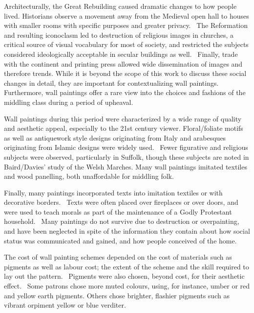Architecturally, the Great Rebuilding caused dramatic changes to how people lived. Historians observe a movement away from the Medieval open hall to houses with smaller rooms with specific purposes and greater privacy.~\autocite{Baird_thesis,Davies_book,Hamling_book} The Reformation and resulting iconoclasm led to destruction of religious images in churches, a critical source of visual vocabulary for most of society, and restricted the subjects considered ideologically acceptable in secular buildings as well.~\autocite{Kirkham_thesis,Hamling_book,Giles} Finally, trade with the continent and printing press allowed wide dissemination of images and therefore trends. While it is beyond the scope of this work to discuss these social changes in detail, they are important for contextualizing wall paintings. Furthermore, wall paintings offer a rare view into the choices and fashions of the middling class during a period of upheaval.~\autocite{Kirkham_thesis,Baird_thesis}

Wall paintings during this period were characterized by a wide range of quality and aesthetic appeal, especially to the 21st century viewer. Floral/foliate motifs as well as antiquework style designs originating from Italy and arabesques originating from Islamic designs were widely used.~\autocite{Kirkham_thesis,Baird_thesis,Thornton_book} Fewer figurative and religious subjects were observed, particularly in Suffolk, though these subjects are noted in Baird/Davies' study of the Welsh Marches. Many wall paintings imitated textiles and wood panelling, both unaffordable for middling folk. 

Finally, many paintings incorporated texts into imitation textiles or with decorative borders.~\autocite{Baird_thesis,Kirkham_thesis} Texts were often placed over fireplaces or over doors, and were used to teach morals as part of the maintenance of a Godly Protestant household.~\autocite{Hamling_book} Many paintings do not survive due to destruction or overpainting, and have been neglected in spite of the information they contain about how social status was communicated and gained, and how people conceived of the home.~\autocite{Benton1,Benton2,Kirkham_thesis}

The cost of wall painting schemes depended on the cost of materials such as pigments as well as labour cost; the extent of the scheme and the skill required to lay out the pattern.~\autocite{Baird_thesis,Davies_book,Kirkham_thesis} Pigments were also chosen, beyond cost, for their aesthetic effect.~\autocite{Kirkham_thesis} Some patrons chose more muted colours, using, for instance, umber or red and yellow earth pigments. Others chose brighter, flashier pigments such as vibrant orpiment yellow or blue verditer. 

